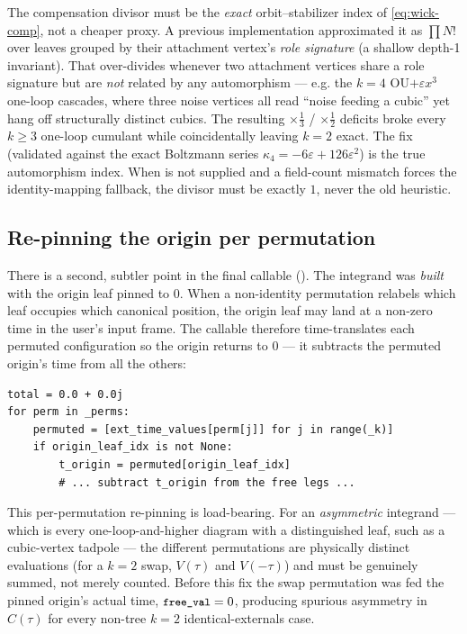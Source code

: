 \begin{gotcha}
The compensation divisor must be the \emph{exact} orbit--stabilizer index of
\eqref{eq:wick-comp}, not a cheaper proxy. A previous implementation approximated
it as $\prod N!$ over leaves grouped by their attachment vertex's
\emph{role signature} (a shallow depth-1 invariant). That over-divides whenever
two attachment vertices share a role signature but are \emph{not} related by any
automorphism --- e.g. the $k=4$ OU$+\varepsilon x^3$ one-loop cascades, where
three noise vertices all read ``noise feeding a cubic'' yet hang off
structurally distinct cubics. The resulting $\times\frac13$ / $\times\frac12$
deficits broke every $k\ge 3$ one-loop cumulant while coincidentally leaving
$k=2$ exact. The fix (validated against the exact Boltzmann series
$\kappa_4 = -6\varepsilon + 126\varepsilon^2$) is the true automorphism index.
When  is not supplied and a field-count mismatch forces
the identity-mapping fallback, the divisor must be exactly $1$, never the old
heuristic.
\end{gotcha}

\subsection{Re-pinning the origin per permutation}

There is a second, subtler point in the final callable
(). The integrand was \emph{built} with the origin
leaf pinned to $0$. When a non-identity permutation relabels which leaf occupies
which canonical position, the origin leaf may land at a non-zero time in the
user's input frame. The callable therefore time-translates each permuted
configuration so the origin returns to $0$ --- it subtracts the permuted origin's
time from all the others:

\begin{lstlisting}
total = 0.0 + 0.0j
for perm in _perms:
    permuted = [ext_time_values[perm[j]] for j in range(_k)]
    if origin_leaf_idx is not None:
        t_origin = permuted[origin_leaf_idx]
        # ... subtract t_origin from the free legs ...
\end{lstlisting}

\begin{gotcha}
This per-permutation re-pinning is load-bearing. For an \emph{asymmetric}
integrand --- which is every one-loop-and-higher diagram with a distinguished leaf,
such as a cubic-vertex tadpole --- the different permutations are physically
distinct evaluations (for a $k=2$ swap, $V(\tau)$ and $V(-\tau)$) and must be
genuinely summed, not merely counted. Before this fix the swap permutation was
fed the pinned origin's actual time, $\texttt{\small free\_val}=0$, producing spurious
asymmetry in $C(\tau)$ for every non-tree $k=2$ identical-externals case.
\end{gotcha}

